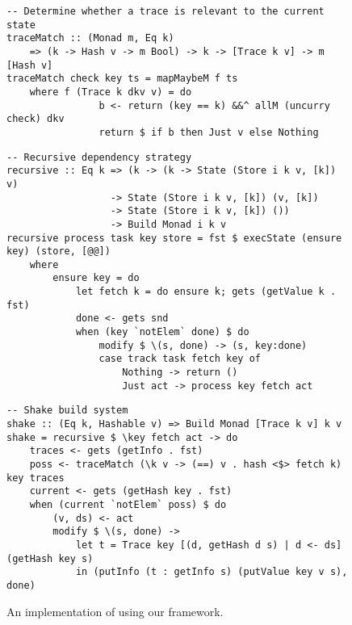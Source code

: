 \begin{figure}
\begin{verbatim}
-- Determine whether a trace is relevant to the current state
traceMatch :: (Monad m, Eq k)
    => (k -> Hash v -> m Bool) -> k -> [Trace k v] -> m [Hash v]
traceMatch check key ts = mapMaybeM f ts
    where f (Trace k dkv v) = do
                b <- return (key == k) &&^ allM (uncurry check) dkv
                return $ if b then Just v else Nothing
\end{verbatim}
\vspace{1mm}
\begin{verbatim}
-- Recursive dependency strategy
recursive :: Eq k => (k -> (k -> State (Store i k v, [k]) v)
                  -> State (Store i k v, [k]) (v, [k])
                  -> State (Store i k v, [k]) ())
                  -> Build Monad i k v
recursive process task key store = fst $ execState (ensure key) (store, [@@])
    where
        ensure key = do
            let fetch k = do ensure k; gets (getValue k . fst)
            done <- gets snd
            when (key `notElem` done) $ do
                modify $ \(s, done) -> (s, key:done)
                case track task fetch key of
                    Nothing -> return ()
                    Just act -> process key fetch act
\end{verbatim}
\vspace{1mm}
\begin{verbatim}
-- Shake build system
shake :: (Eq k, Hashable v) => Build Monad [Trace k v] k v
shake = recursive $ \key fetch act -> do
    traces <- gets (getInfo . fst)
    poss <- traceMatch (\k v -> (==) v . hash <$> fetch k) key traces
    current <- gets (getHash key . fst)
    when (current `notElem` poss) $ do
        (v, ds) <- act
        modify $ \(s, done) ->
            let t = Trace key [(d, getHash d s) | d <- ds] (getHash key s)
            in (putInfo (t : getInfo s) (putValue key v s), done)

\end{verbatim}
\vspace{-3mm}
\caption{An implementation of \Shake using our framework.}\label{fig-shake-implementation}
\vspace{1mm}
\end{figure}

\subsection{\Bazel}\label{sec-implementation-bazel}

